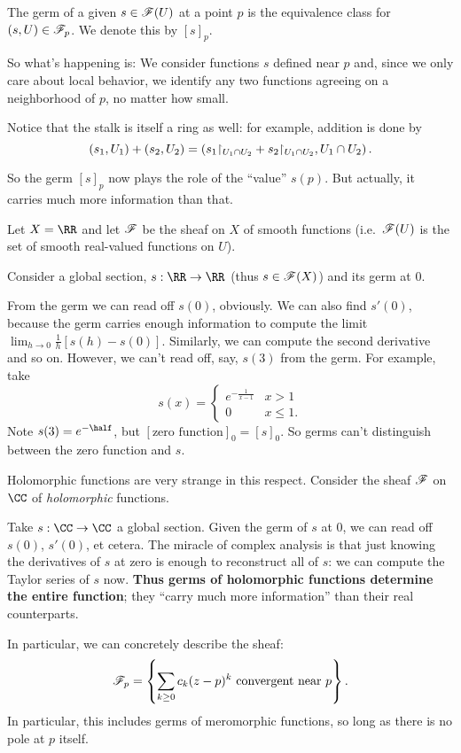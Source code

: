 \begin{definition}
	The germ of a given $s \in \mathscr F(U)$ at a point $p$
	is the equivalence class for $(s,U) \in \mathscr F_p$.
	We denote this by $[s]_p$.
\end{definition}

So what's happening is: We consider functions $s$ defined near $p$
and, since we only care about local behavior,
we identify any two functions agreeing on a neighborhood of $p$,
no matter how small.

Notice that the stalk is itself a ring as well:
for example, addition is done by
\[ 
	\left( s_1, U_1 \right) + \left( s_2, U_2 \right)
	=
	\left( s_1 \restrict{U_1 \cap U_2} + s_2 \restrict{U_1 \cap U_2},
	U_1 \cap U_2 \right).
\]

So the germ $[s]_p$ now plays the role of the ``value'' $s(p)$.
But actually, it carries much more information than that.

\begin{example}
	Let $X = \RR$ and let $\mathscr F$ be the sheaf on $X$ of smooth functions
	(i.e.\ $\mathscr F(U)$ is the set of smooth real-valued functions on $U$).

	Consider a global section, $s : \RR \to \RR$ (thus $s \in \mathscr F(X)$)
	and its germ at $0$.
	\begin{enumerate}[(a)]
		\ii From the germ we can read off $s(0)$, obviously.
		\ii We can also find $s'(0)$, because the germ carries enough
		information to compute the limit $\lim_{h \to 0} \frac1h[s(h)-s(0)]$.
		\ii Similarly, we can compute the second derivative and so on.
		\ii However, we can't read off, say, $s(3)$ from the germ.
		For example, take
		\[
			s(x) = \begin{cases}
				e^{-\frac{1}{x-1}} & x > 1 \\
				0 & x \le 1.
			\end{cases}
		\]
		Note $s(3) = e^{-\half}$, but $[\text{zero function}]_0 = [s]_0$.
		So germs can't distinguish between the zero function and $s$.
	\end{enumerate}
\end{example}
\begin{example}
	Holomorphic functions are very strange in this respect.
	Consider the sheaf $\mathscr F$ on $\CC$ of \emph{holomorphic} functions.

	Take $s : \CC \to \CC$ a global section.
	Given the germ of $s$ at $0$, we can read off $s(0)$, $s'(0)$, et cetera.
	The miracle of complex analysis is that just knowing
	the derivatives of $s$ at zero is enough to reconstruct all of $s$:
	we can compute the Taylor series of $s$ now.
	\textbf{Thus germs of holomorphic functions determine the entire function};
	they ``carry much more information'' than their real counterparts.
	
	In particular, we can concretely describe the sheaf:
	\[
		\mathscr F_p = \left\{
			\sum_{k \ge 0} c_k (z-p)^k
			\text{ convergent near $p$}
		\right\}.
	\]
	In particular, this includes germs of meromorphic functions,
	so long as there is no pole at $p$ itself.
\end{example}

